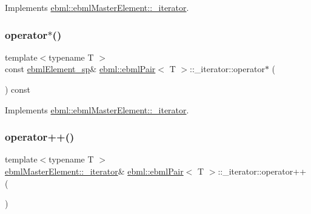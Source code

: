 Implements \mbox{\hyperlink{classebml_1_1ebmlMasterElement_1_1__iterator_aef9e45972d70a546942f9de73af40dc2}{ebml\+::ebml\+Master\+Element\+::\+\_\+iterator}}.

\mbox{\label{classebml_1_1ebmlPair_1_1__iterator_ae7f85d6a25b93280837766d206574604}} 
\subsubsection{\texorpdfstring{operator$\ast$()}{operator*()}}
{\footnotesize\ttfamily template$<$typename T $>$ \\
const \mbox{\hyperlink{namespaceebml_adad533b7705a16bb360fe56380c5e7be}{ebml\+Element\+\_\+sp}}\& \mbox{\hyperlink{classebml_1_1ebmlPair}{ebml\+::ebml\+Pair}}$<$ T $>$\+::\+\_\+iterator\+::operator$\ast$ (\begin{DoxyParamCaption}{ }\end{DoxyParamCaption}) const\hspace{0.3cm}{\ttfamily [virtual]}}



Implements \mbox{\hyperlink{classebml_1_1ebmlMasterElement_1_1__iterator_a3275ab5cdba37d79dd323879598f4f5d}{ebml\+::ebml\+Master\+Element\+::\+\_\+iterator}}.

\mbox{\label{classebml_1_1ebmlPair_1_1__iterator_a72dd1b1a818c44cc855f9340f3acbbe5}} 
\subsubsection{\texorpdfstring{operator++()}{operator++()}}
{\footnotesize\ttfamily template$<$typename T $>$ \\
\mbox{\hyperlink{classebml_1_1ebmlMasterElement_1_1__iterator}{ebml\+Master\+Element\+::\+\_\+iterator}}\& \mbox{\hyperlink{classebml_1_1ebmlPair}{ebml\+::ebml\+Pair}}$<$ T $>$\+::\+\_\+iterator\+::operator++ (\begin{DoxyParamCaption}{ }\end{DoxyParamCaption})\hspace{0.3cm}{\ttfamily [virtual]}}



